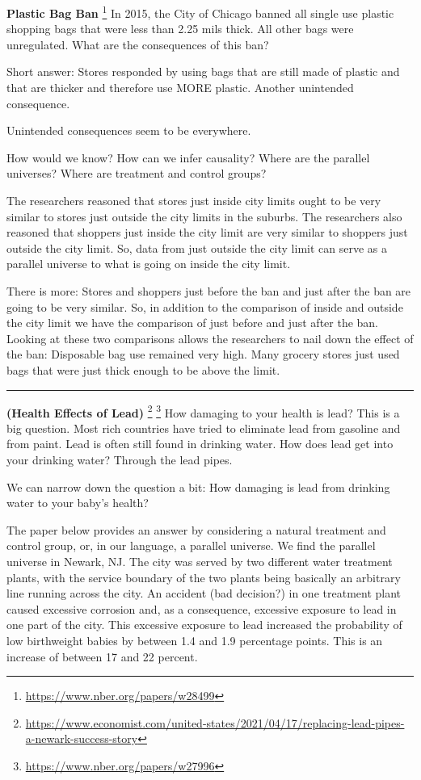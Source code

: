 \documentclass[
]{book}
\begin{document}
\textbf{Plastic Bag Ban} \footnote{\url{https://www.nber.org/papers/w28499}} In 2015, the City of Chicago banned all single use plastic shopping bags that were less than 2.25 mils thick. All other bags were unregulated. What are the consequences of this ban?

Short answer: Stores responded by using bags that are still made of plastic and that are thicker and therefore use MORE plastic. Another unintended consequence.

Unintended consequences seem to be everywhere.

How would we know? How can we infer causality? Where are the parallel universes? Where are treatment and control groups?

The researchers reasoned that stores just inside city limits ought to be very similar to stores just outside the city limits in the suburbs. The researchers also reasoned that shoppers just inside the city limit are very similar to shoppers just outside the city limit. So, data from just outside the city limit can serve as a parallel universe to what is going on inside the city limit.

There is more: Stores and shoppers just before the ban and just after the ban are going to be very similar. So, in addition to the comparison of inside and outside the city limit we have the comparison of just before and just after the ban. Looking at these two comparisons allows the researchers to nail down the effect of the ban: Disposable bag use remained very high. Many grocery stores just used bags that were just thick enough to be above the limit.

\begin{center}\rule{0.5\linewidth}{0.5pt}\end{center}

\textbf{(Health Effects of Lead)} \footnote{\url{https://www.economist.com/united-states/2021/04/17/replacing-lead-pipes-a-newark-success-story}} \footnote{\url{https://www.nber.org/papers/w27996}} How damaging to your health is lead? This is a big question. Most rich countries have tried to eliminate lead from gasoline and from paint. Lead is often still found in drinking water. How does lead get into your drinking water? Through the lead pipes.

We can narrow down the question a bit: How damaging is lead from drinking water to your baby's health?

The paper below provides an answer by considering a natural treatment and control group, or, in our language, a parallel universe. We find the parallel universe in Newark, NJ. The city was served by two different water treatment plants, with the service boundary of the two plants being basically an arbitrary line running across the city. An accident (bad decision?) in one treatment plant caused excessive corrosion and, as a consequence, excessive exposure to lead in one part of the city. This excessive exposure to lead increased the probability of low birthweight babies by between 1.4 and 1.9 percentage points. This is an increase of between 17 and 22 percent.
\end{document}
